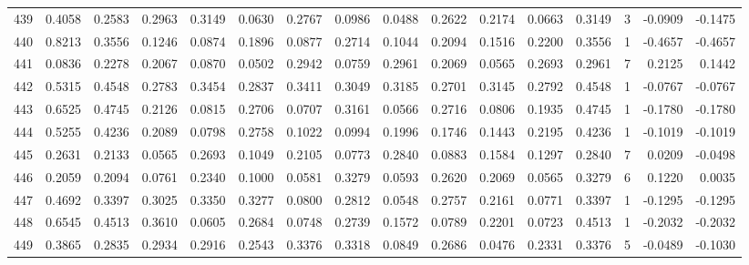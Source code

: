\begin{tabular}{lrrrrrrrrrrrrrrr}
439 &      0.4058 &  0.2583 &  0.2963 &  0.3149 &  0.0630 &  0.2767 &  0.0986 &  0.0488 &  0.2622 &  0.2174 &   0.0663 &     0.3149 &      3 &                   -0.0909 &                    -0.1475 \\
440 &      0.8213 &  0.3556 &  0.1246 &  0.0874 &  0.1896 &  0.0877 &  0.2714 &  0.1044 &  0.2094 &  0.1516 &   0.2200 &     0.3556 &      1 &                   -0.4657 &                    -0.4657 \\
441 &      0.0836 &  0.2278 &  0.2067 &  0.0870 &  0.0502 &  0.2942 &  0.0759 &  0.2961 &  0.2069 &  0.0565 &   0.2693 &     0.2961 &      7 &                    0.2125 &                     0.1442 \\
442 &      0.5315 &  0.4548 &  0.2783 &  0.3454 &  0.2837 &  0.3411 &  0.3049 &  0.3185 &  0.2701 &  0.3145 &   0.2792 &     0.4548 &      1 &                   -0.0767 &                    -0.0767 \\
443 &      0.6525 &  0.4745 &  0.2126 &  0.0815 &  0.2706 &  0.0707 &  0.3161 &  0.0566 &  0.2716 &  0.0806 &   0.1935 &     0.4745 &      1 &                   -0.1780 &                    -0.1780 \\
444 &      0.5255 &  0.4236 &  0.2089 &  0.0798 &  0.2758 &  0.1022 &  0.0994 &  0.1996 &  0.1746 &  0.1443 &   0.2195 &     0.4236 &      1 &                   -0.1019 &                    -0.1019 \\
445 &      0.2631 &  0.2133 &  0.0565 &  0.2693 &  0.1049 &  0.2105 &  0.0773 &  0.2840 &  0.0883 &  0.1584 &   0.1297 &     0.2840 &      7 &                    0.0209 &                    -0.0498 \\
446 &      0.2059 &  0.2094 &  0.0761 &  0.2340 &  0.1000 &  0.0581 &  0.3279 &  0.0593 &  0.2620 &  0.2069 &   0.0565 &     0.3279 &      6 &                    0.1220 &                     0.0035 \\
447 &      0.4692 &  0.3397 &  0.3025 &  0.3350 &  0.3277 &  0.0800 &  0.2812 &  0.0548 &  0.2757 &  0.2161 &   0.0771 &     0.3397 &      1 &                   -0.1295 &                    -0.1295 \\
448 &      0.6545 &  0.4513 &  0.3610 &  0.0605 &  0.2684 &  0.0748 &  0.2739 &  0.1572 &  0.0789 &  0.2201 &   0.0723 &     0.4513 &      1 &                   -0.2032 &                    -0.2032 \\
449 &      0.3865 &  0.2835 &  0.2934 &  0.2916 &  0.2543 &  0.3376 &  0.3318 &  0.0849 &  0.2686 &  0.0476 &   0.2331 &     0.3376 &      5 &                   -0.0489 &                    -0.1030 \\

\end{tabular}
